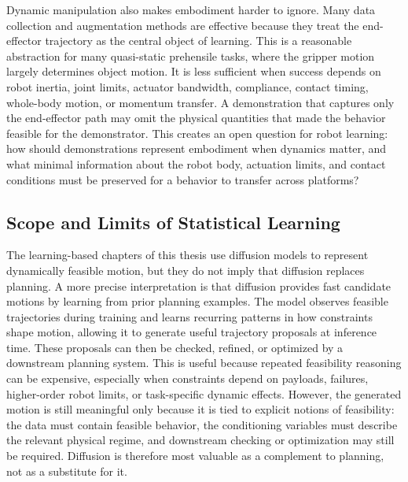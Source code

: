 Dynamic manipulation also makes embodiment harder to ignore.
Many data collection and augmentation methods are effective because they treat the end-effector trajectory as the central object of learning.
This is a reasonable abstraction for many quasi-static prehensile tasks, where the gripper motion largely determines object motion.
It is less sufficient when success depends on robot inertia, joint limits, actuator bandwidth, compliance, contact timing, whole-body motion, or momentum transfer.
A demonstration that captures only the end-effector path may omit the physical quantities that made the behavior feasible for the demonstrator.
This creates an open question for robot learning: how should demonstrations represent embodiment when dynamics matter, and what minimal information about the robot body, actuation limits, and contact conditions must be preserved for a behavior to transfer across platforms?

\subsection{Scope and Limits of Statistical Learning}
\label{sec:discussion:learning}

The learning-based chapters of this thesis use diffusion models to represent dynamically feasible motion, but they do not imply that diffusion replaces planning.
A more precise interpretation is that diffusion provides fast candidate motions by learning from prior planning examples.
The model observes feasible trajectories during training and learns recurring patterns in how constraints shape motion, allowing it to generate useful trajectory proposals at inference time.
These proposals can then be checked, refined, or optimized by a downstream planning system.
This is useful because repeated feasibility reasoning can be expensive, especially when constraints depend on payloads, failures, higher-order robot limits, or task-specific dynamic effects.
However, the generated motion is still meaningful only because it is tied to explicit notions of feasibility: the data must contain feasible behavior, the conditioning variables must describe the relevant physical regime, and downstream checking or optimization may still be required.
Diffusion is therefore most valuable as a complement to planning, not as a substitute for it.

